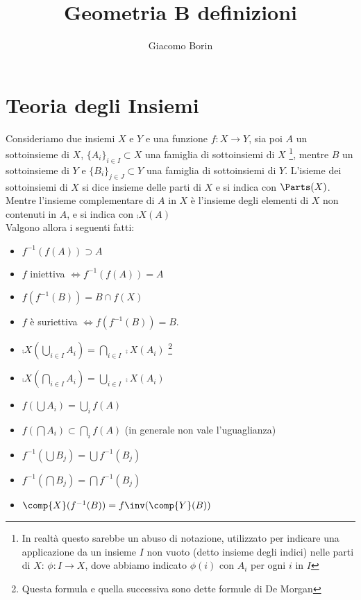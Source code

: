 \documentclass[a4paper]{article}
\begin{document}
\author{Giacomo Borin}
\title{Geometria B definizioni}
\maketitle

\section{Teoria degli Insiemi}
Consideriamo due insiemi $X$ e $Y$ e una funzione $ f:X \to Y$, sia poi $A$ un sottoinsieme di $X$, $ \{ A_i \} _{i \in I } \subset X $ una famiglia di sottoinsiemi di $X$ \footnote{In realtà questo sarebbe un abuso di notazione, utilizzato per indicare una applicazione da un insieme $I$ non vuoto (detto insieme degli indici) nelle parti di $X$: $\phi: I \to X$, dove abbiamo indicato $\phi(i)$ con $A_i$ per ogni $i$ in $I$}, mentre $B$ un sottoinsieme di $Y$ e  $\{ B_i \} _{j \in J } \subset Y $ una famiglia di sottoinsiemi di $Y$. L'isieme dei sottoinsiemi di $X$ si dice insieme delle parti di $X$ e si indica con $\Parts (X)$. Mentre l'insieme complementare di $A$ in $X$ è l'insieme degli elementi di $X$ non contenuti in $A$, e si indica con $\comp{X}(A)$ \\
Valgono allora i seguenti fatti: 
\begin{itemize}
	\item $ f^{-1} ( f(A)) \supset A $ 
	\item $f$ iniettiva $\Leftrightarrow f^{-1} ( f(A)) = A $ 
	\item $f(f^{-1} ( B)) = B \cap f(X) $ 
	\item $f$ è suriettiva $\Leftrightarrow f(f^{-1} ( B)) = B $.
	\item $ \comp{X} ( \bigcup_{i \in I} A_i ) = \bigcap _{i \in I} \comp{X} (A_i) $ \footnote{Questa formula e quella successiva sono dette formule di De Morgan}
	\item $ \comp{X} ( \bigcap_{i \in I} A_i ) = \bigcup _{i \in I} \comp{X} (A_i) $ 
	\item $ f(\bigcup A_i ) = \bigcup _i  f(A) $
	\item $ f(\bigcap A_i ) \subset \bigcap _i  f(A) $ (in generale non vale l'uguaglianza)
	\item $ f^{-1} (\bigcup B_j ) = \bigcup f^{-1} (B_j ) $
	\item  $ f^{-1} (\bigcap B_j ) = \bigcap f^{-1} (B_j ) $ 
	\item $ \comp{X} (f^{-1} (B)) = f \inv (\comp{Y} (B)) $
\end{itemize}
\end{document}
